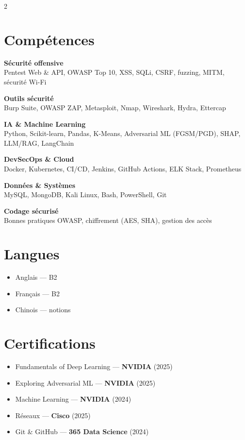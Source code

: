 \documentclass[a4paper,10pt]{article}
\newcommand{\skillcat}[2]{%
  {\bfseries\color{darktext}#1}\\[1pt]{\small\color{graytext}#2}\par\vspace{5pt}}
\begin{document}
\setlength{\columnsep}{1.4em}
\begin{paracol}{2}

\section*{}
\vspace{-14pt}

\section{Compétences}
\skillcat{Sécurité offensive}{Pentest Web \& API, OWASP Top 10, XSS, SQLi, CSRF, fuzzing, MITM, sécurité Wi-Fi}
\skillcat{Outils sécurité}{Burp Suite, OWASP ZAP, Metasploit, Nmap, Wireshark, Hydra, Ettercap}
\skillcat{IA \& Machine Learning}{Python, Scikit-learn, Pandas, K-Means, Adversarial ML (FGSM/PGD), SHAP, LLM/RAG, LangChain}
\skillcat{DevSecOps \& Cloud}{Docker, Kubernetes, CI/CD, Jenkins, GitHub Actions, ELK Stack, Prometheus}
\skillcat{Données \& Systèmes}{MySQL, MongoDB, Kali Linux, Bash, PowerShell, Git}
\skillcat{Codage sécurisé}{Bonnes pratiques OWASP, chiffrement (AES, SHA), gestion des accès}

\section{Langues}
\begin{itemize}
  \item Anglais — B2
  \item Français — B2
  \item Chinois — notions
\end{itemize}

\section{Certifications}
\begin{itemize}
  \item Fundamentals of Deep Learning — \textbf{NVIDIA} (2025)
  \item Exploring Adversarial ML — \textbf{NVIDIA} (2025)
  \item Machine Learning — \textbf{NVIDIA} (2024)
  \item Réseaux — \textbf{Cisco} (2025)
  \item Git \& GitHub — \textbf{365 Data Science} (2024)
\end{itemize}


\end{paracol}
\end{document}
